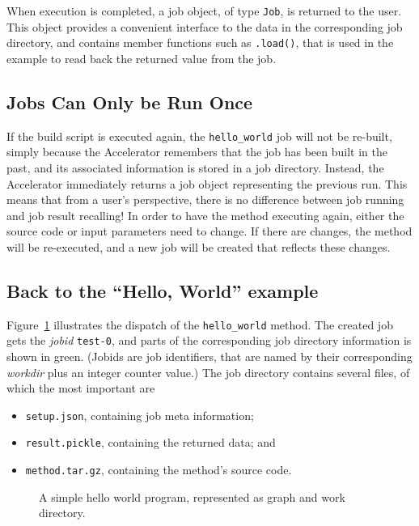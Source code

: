 When execution is completed, a job object, of type \texttt{Job}, is
returned to the user.  This object provides a convenient interface to
the data in the corresponding job directory, and contains member
functions such as \texttt{.load()}, that is used in the example to
read back the returned value from the job.


\subsection{Jobs Can Only be Run Once}
If the build script is executed again, the \texttt{hello\_world} job
will not be re-built, simply because the Accelerator remembers that
the job has been built in the past, and its associated information is
stored in a job directory.  Instead, the Accelerator immediately
returns a job object representing the previous run.  This means that
from a user's perspective, there is no difference between job running
and job result recalling!  In order to have the method executing
again, either the source code or input parameters need to change.  If
there are changes, the method will be re-executed, and a new job will
be created that reflects these changes.


\subsection{Back to the ``Hello, World'' example}
Figure~\ref{fig:execflow-hello-world} illustrates the dispatch of the
\texttt{hello\_world} method.  The created job gets the \textsl{jobid}
\texttt{test-0}, and parts of the corresponding job directory
information is shown in green.  (Jobids are job identifiers, that are
named by their corresponding \textsl{workdir} plus an integer counter
value.)  The job directory contains several files, of which the most
important are
\begin{itemize}
\item[] \texttt{setup.json}, containing job meta information;
\item[] \texttt{result.pickle}, containing the returned data; and
\item[] \texttt{method.tar.gz}, containing the method's source code.
\end{itemize}

\begin{figure}[h!]
  \begin{center}
    
    \caption{A simple hello world program, represented as graph and
      work directory.}
    \label{fig:execflow-hello-world}
  \end{center}
\end{figure}

